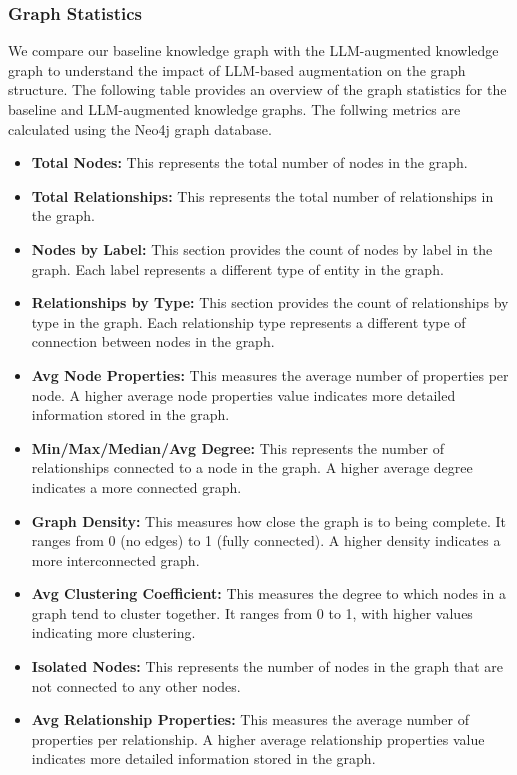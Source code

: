\documentclass{article}
\begin{document}
\subsubsection{Graph Statistics}
We compare our baseline knowledge graph with the LLM-augmented knowledge graph
to understand the impact of LLM-based augmentation on the graph structure. The
following table provides an overview of the graph statistics for the baseline
and LLM-augmented knowledge graphs.
The follwing metrics are calculated using the Neo4j graph database.
\begin{itemize}
      \item \textbf{Total Nodes:} This represents the total number of nodes in
            the graph.
      \item \textbf{Total Relationships:} This represents the total number of
            relationships in the graph.
      \item \textbf{Nodes by Label:} This section provides the count of nodes
            by
            label in the graph. Each label represents a different type of
            entity
            in the
            graph.
      \item \textbf{Relationships by Type:} This section provides the count of
            relationships by type in the graph. Each relationship type
            represents
            a
            different type of connection between nodes in the graph.
      \item \textbf{Avg Node Properties:} This measures the average number of
            properties per node. A higher average node properties value
            indicates
            more
            detailed information stored in the graph.
      \item \textbf{Min/Max/Median/Avg Degree:} This represents the number of
            relationships connected to a node in the graph. A higher average
            degree
            indicates a more connected graph.
      \item \textbf{Graph Density:} This measures how close the graph is to
            being
            complete. It ranges from 0 (no edges) to 1 (fully connected). A
            higher density
            indicates a more interconnected graph.
      \item \textbf{Avg Clustering Coefficient:} This measures the degree to
            which nodes in a graph tend to cluster together. It ranges from 0
            to
            1, with
            higher values indicating more clustering.
      \item \textbf{Isolated Nodes:} This represents the number of nodes in the
            graph that are not connected to any other nodes.
      \item \textbf{Avg Relationship Properties:} This measures the average
            number of properties per relationship. A higher average
            relationship
            properties
            value indicates more detailed information stored in the graph.
\end{itemize}
\end{document}
